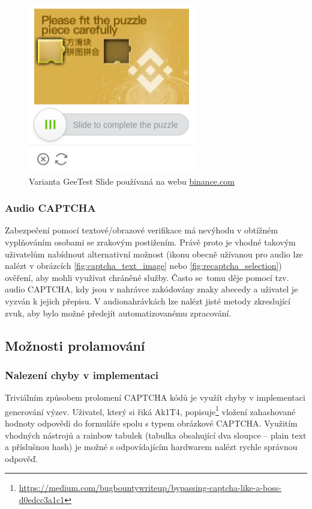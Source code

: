 \documentclass[
  field=ainfp,
  master=true,
  biblatex,
  sourcecodes=false,
  theorems=false,
  glossaries,
  index
]{kidiplom}
\begin{document}
\begin{figure}[H]
  \centering
  \includegraphics[scale=0.7]{images/geetest.png}
  \caption{Varianta GeeTest Slide používaná na webu \url{binance.com}}
  \label{fig:captcha_geetest}
\end{figure}

\subsubsection*{Audio CAPTCHA}
Zabezpečení pomocí textové/obrazové verifikace má nevýhodu v obtížném vyplňováním osobami se zrakovým postižením. Právě proto je vhodné takovým uživatelům nabídnout alternativní možnost (ikonu obecně užívanou pro audio lze nalézt v obrázcích \ref{fig:captcha_text_image} nebo \ref{fig:recaptcha_selection}) ověření, aby mohli využívat chráněné služby. Často se~tomu děje pomocí tzv. audio CAPTCHA, kdy jsou v nahrávce zakódovány znaky abecedy a uživatel je vyzván k jejich přepisu. V audionahrávkách lze nalézt jisté metody zkreslující zvuk, aby bylo možné předejít automatizovanému zpracování.

\subsection{Možnosti prolamování}
\subsubsection*{Nalezení chyby v implementaci}
Triviálním způsobem prolomení CAPTCHA kódů je využít chyby v implementaci generování výzev. Uživatel, který si řiká Ak1T4, popisuje\footnote{\url{https://medium.com/bugbountywriteup/bypassing-captcha-like-a-boss-d0edcc3a1c1}} vložení zahashované hodnoty odpovědi do formuláře spolu s typem obrázkové CAPTCHA. Využitím vhodných nástrojů a rainbow tabulek (tabulka obsahující dva sloupce -- plain text a příslušnou hash) je možné s odpovídajícím hardwarem nalézt rychle správnou odpověď.
\end{document}
